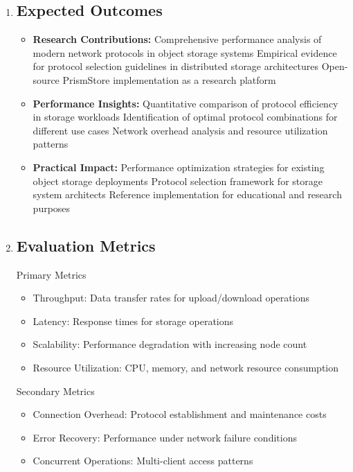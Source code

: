\documentclass[12pt]{article}
\begin{document}
\begin{enumerate}
    \item \subsection*{Expected Outcomes}
        \begin{itemize}
            \item \textbf {Research Contributions:} Comprehensive performance analysis of modern network protocols in object storage systems
            Empirical evidence for protocol selection guidelines in distributed storage architectures
            Open-source PrismStore implementation as a research platform
            \item \textbf {Performance Insights:} Quantitative comparison of protocol efficiency in storage workloads
            Identification of optimal protocol combinations for different use cases
            Network overhead analysis and resource utilization patterns
            \item \textbf {Practical Impact:} Performance optimization strategies for existing object storage deployments
            Protocol selection framework for storage system architects
            Reference implementation for educational and research purposes
        \end{itemize}

    \item \subsection*{Evaluation Metrics}
        Primary Metrics
        \begin{itemize}
            \item Throughput: Data transfer rates for upload/download operations
            \item Latency: Response times for storage operations
            \item Scalability: Performance degradation with increasing node count
            \item Resource Utilization: CPU, memory, and network resource consumption
        \end{itemize}
        Secondary Metrics
        \begin{itemize}
            \item Connection Overhead: Protocol establishment and maintenance costs
            \item Error Recovery: Performance under network failure conditions
            \item Concurrent Operations: Multi-client access patterns
        \end{itemize}


\end{enumerate}
\end{document}
